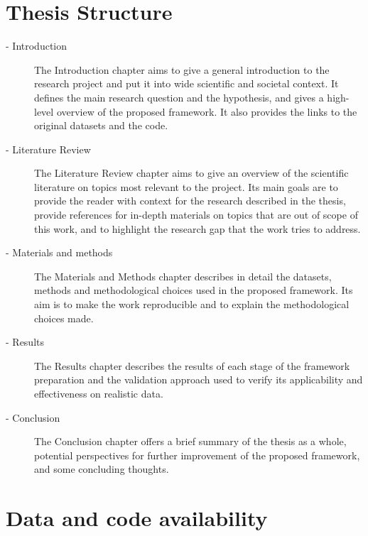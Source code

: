 \section{Thesis Structure}

\begin{description}
    \item[ - Introduction]
The Introduction chapter aims to give a general introduction to the research project and put it into wide scientific and societal context.
It defines the main research question and the hypothesis, and gives a high-level overview of the proposed framework.
It also provides the links to the original datasets and the code.

    \item[ - Literature Review]
The Literature Review chapter aims to give an overview of the scientific literature on topics most relevant to the project.
Its main goals are to provide the reader with context for the research described in the thesis, provide references for in-depth materials on topics that are out of scope of this work, and to highlight the research gap that the work tries to address.

	\item[ - Materials and methods]
The Materials and Methods chapter describes in detail the datasets, methods and methodological choices used in the proposed framework.
Its aim is to make the work reproducible and to explain the methodological choices made.

	\item[ - Results]
The Results chapter describes the results of each stage of the framework preparation and the validation approach used to verify its applicability and effectiveness on realistic data.

    \item[ - Conclusion]
The Conclusion chapter offers a brief summary of the thesis as a whole, potential perspectives for further improvement of the proposed framework, and some concluding thoughts.

\end{description}

\section{Data and code availability}

